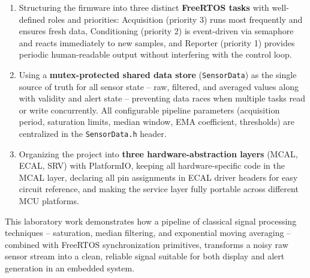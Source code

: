 \begin{enumerate}
    crossings while the dead band prevents chattering near the threshold.
  \item Structuring the firmware into three distinct \textbf{FreeRTOS tasks} with
    well-defined roles and priorities: Acquisition (priority 3) runs most frequently and
    ensures fresh data, Conditioning (priority 2) is event-driven via semaphore and
    reacts immediately to new samples, and Reporter (priority 1) provides periodic
    human-readable output without interfering with the control loop.
  \item Using a \textbf{mutex-protected shared data store} (\texttt{SensorData}) as
    the single source of truth for all sensor state -- raw, filtered, and averaged
    values along with validity and alert state -- preventing data races when multiple
    tasks read or write concurrently. All configurable pipeline parameters (acquisition
    period, saturation limits, median window, EMA coefficient, thresholds) are
    centralized in the \texttt{SensorData.h} header.
  \item Organizing the project into \textbf{three hardware-abstraction layers} (MCAL,
    ECAL, SRV) with PlatformIO, keeping all hardware-specific code in the MCAL layer,
    declaring all pin assignments in ECAL driver headers for easy circuit reference,
    and making the service layer fully portable across different MCU platforms.
\end{enumerate}

This laboratory work demonstrates how a pipeline of classical signal processing
techniques -- saturation, median filtering, and exponential moving averaging --
combined with FreeRTOS synchronization primitives, transforms a noisy raw sensor
stream into a clean, reliable signal suitable for both display and alert generation
in an embedded system.

